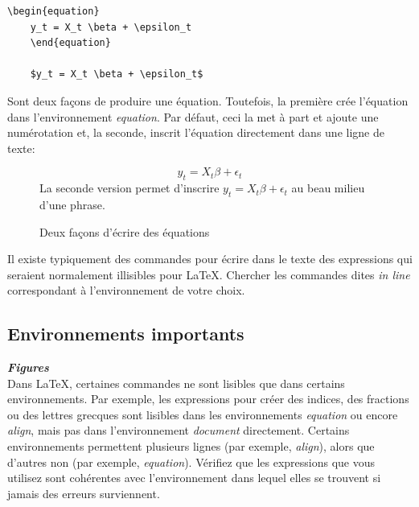 \documentclass[12pt]{article}
\begin{document}
	\begin{lstlisting}[frame=single]
	\begin{equation}
	y_t = X_t \beta + \epsilon_t
	\end{equation}
	
	$y_t = X_t \beta + \epsilon_t$
	\end{lstlisting}
	
	Sont deux façons de produire une équation. Toutefois, la première crée l'équation dans l'environnement \textit{equation}. Par défaut, ceci la met à part et ajoute une numérotation et, la seconde, inscrit l'équation directement dans une ligne de texte:
	
	\begin{figure}[H]
		\begin{equation}
		y_t = X_t \beta + \epsilon_t
		\end{equation}
		La seconde version permet d'inscrire $y_t = X_t \beta + \epsilon_t$ au beau milieu d'une phrase.
		\caption{Deux façons d'écrire des équations}
	\end{figure}
	
	Il existe typiquement des commandes pour écrire dans le texte des expressions qui seraient normalement illisibles pour LaTeX. Chercher les commandes dites \textit{in line} correspondant à l'environnement de votre choix.
	
	\subsection{Environnements importants}
	
	\textbf{\textit{Figures}} \\
	Dans LaTeX, certaines commandes ne sont lisibles que dans certains environnements. Par exemple, les expressions pour créer des indices, des fractions ou des lettres grecques sont lisibles dans les environnements \textit{equation} ou encore \textit{align}, mais pas dans l'environnement \textit{document} directement. Certains environnements permettent plusieurs lignes (par exemple, \textit{align}), alors que d'autres non (par exemple, \textit{equation}). Vérifiez que les expressions que vous utilisez sont cohérentes avec l'environnement dans lequel elles se 
	trouvent si jamais des erreurs surviennent. \\
	
\end{document}
